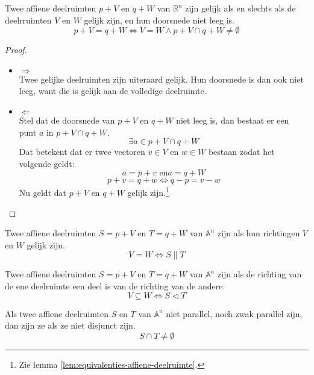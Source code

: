\documentclass[main.tex]{subfiles}
\begin{document}
\begin{st}
  \label{st:affiene-deelruimten-niet-lege-doorsnede-gelijk}
  Twee affiene deelruimten $p + V$ en $q + W$ van $\mathbb{R}^{n}$ zijn gelijk als en slechts als de deelrruimten $V$ en $W$ gelijk zijn, en hun doorsnede niet leeg is.
  \[ p+V = q+W \Leftrightarrow V = W \wedge p+V \cap q+W \neq \emptyset \]
  
  \begin{proof}
    \begin{itemize}
    \item $\Rightarrow$\\
      Twee gelijke deelruimten zijn uiteraard gelijk. Hun doorsnede is dan ook niet leeg, want die is gelijk aan de volledige deelruimte.
    \item $\Leftarrow$\\
      Stel dat de doorsnede van $p + V$ en $q + W$ niet leeg is, dan bestaat er een punt $a$ in $p + V \cap q + W$.
      \[ \exists a \in p + V \cap q + W \]
      Dat betekent dat er twee vectoren $v \in V$ en $w \in W$ bestaan zodat het volgende geldt:
      \[ a = p + v \text{ en} a = q + W \]
      \[ p+v = q+w \Leftrightarrow q-p = v-w\]
      Nu geldt dat $p + V$ en $q + W$ gelijk zijn.\footnote{Zie lemma \ref{lem:equivalenties-affiene-deelruimte}.}
    \end{itemize}
  \end{proof}
\end{st}

\begin{de}
\label{de:parallel}
  Twee affiene deelruimten $S = p + V$ en $T = q + W$ van $\mathbb{A}^{n}$ zijn  als hun richtingen $V$ en $W$ gelijk zijn.
  \[ V = W \Leftrightarrow S \parallel T \]
\end{de}

\begin{de}
\label{de:zwak-parallel}
  Twee affiene deelruimten $S = p + V$ en $T = q + W$ van $\mathbb{A}^{n}$ zijn  als de richting van de ene deelruimte een deel is van de richting van de andere.
  \[ V \subseteq W \Leftrightarrow S \vartriangleleft T \]
\end{de}

\begin{de}
  Als twee affiene deelruimten $S$ en $T$ van $\mathbb{A}^{n}$ niet parallel, noch zwak parallel zijn, dan zijn ze  als ze niet disjunct zijn.
  \[ S \cap T \neq \emptyset \]
\end{de}
\end{document}
